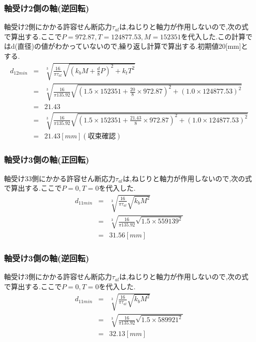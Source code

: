 \subsubsection{軸受け2側の軸(逆回転)}
軸受け2側にかかる許容せん断応力$\tau_{al}$は,ねじりと軸力が作用しないので,次の式で算出する.ここで$P=972.87,T=124877.53, M=152351$を代入した.この計算ではd(直径)の値がわかっていないので,繰り返し計算で算出する.初期値20[mm]とする.
\begin{eqnarray}
d_{12min}&=& \sqrt [3]{ \frac{16}{\pi \tau_{al}}\sqrt{(k_bM+\frac{d}{8}P)^2+k_tT^2} }\\
       &=& \sqrt [3]{ \frac{16}{\pi 135.92} \sqrt{(1.5 \times 152351  +\frac{20}{8}\times 972.87)^2+(1.0 \times 124877.53)^2} }\\
&=&21.43\\
       &=& \sqrt [3]{ \frac{16}{\pi 135.92} \sqrt{(1.5 \times 152351  +\frac{21.43}{8}\times 972.87)^2+(1.0 \times 124877.53)^2} }\\
       &=&21.43[mm](収束確認)
\end{eqnarray}
\subsubsection{軸受け3側の軸(正回転)}
軸受け33側にかかる許容せん断応力$\tau_{al}$は,ねじりと軸力が作用しないので,次の式で算出する.ここで$P=0,T=0$を代入した.
\begin{eqnarray}
d_{11min} &=& \sqrt [3]{ \frac{16}{\pi \tau_{al}}\sqrt{k_bM^2} }\\
         &=& \sqrt [3]{ \frac{16}{\pi 135.92}\sqrt{1.5 \times 559139^2} }\\
         &=& 31.56[mm]
\end{eqnarray}
\subsubsection{軸受け3側の軸(逆回転)}
軸受け3側にかかる許容せん断応力$\tau_{al}$は,ねじりと軸力が作用しないので,次の式で算出する.ここで$P=0,T=0$を代入した.
\begin{eqnarray}
d_{11min} &=& \sqrt [3]{ \frac{16}{\pi \tau_{al}}\sqrt{k_bM^2} }\\
         &=& \sqrt [3]{ \frac{16}{\pi 135.92}\sqrt{1.5 \times 589921^2} }\\
         &=& 32.13[mm]
\end{eqnarray}
